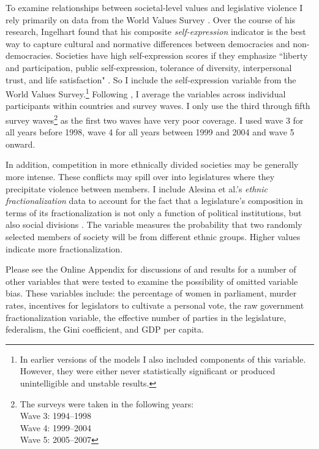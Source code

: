 \documentclass[a4paper]{article}\usepackage[]{graphicx}\usepackage[]{color}
\begin{document}
To examine relationships between societal-level values and legislative violence I rely primarily on data from the World Values Survey \citeyearpar{WVS2009}. Over the course of his research, Ingelhart found that his composite {\emph{self-expression}} indicator is the best way to capture cultural and normative differences between democracies and non-democracies. Societies have high self-expression scores if they emphasize ``liberty and participation, public self-expression, tolerance of diversity, interpersonal trust, and life satisfaction" \citep[64]{Inglehart2003}. So I include the self-expression variable from the World Values Survey.\footnote{In earlier versions of the models I also included components of this variable. However, they were either never statistically significant or produced unintelligible and unstable results.} Following \cite{Inglehart2003}, I average the variables across individual participants within countries and survey waves. I only use the third through fifth survey waves\footnote{The surveys were taken in the following years: \\ Wave 3: 1994--1998 \\ Wave 4: 1999--2004 \\ Wave 5: 2005--2007} as the first two waves have very poor coverage. I used wave 3 for all years before 1998, wave 4 for all years between 1999 and 2004 and wave 5 onward.

In addition, competition in more ethnically divided societies may be generally more intense. These conflicts may spill over into legislatures where they precipitate violence between members. I include Alesina et al.'s \citeyearpar{Alesina2003} {\emph{ethnic fractionalization}} data to account for the fact that a legislature's composition in terms of its fractionalization is not only a function of political institutions, but also social divisions \citep{Neto1997, Mozaffar2003}. The variable measures the probability that two randomly selected members of society will be from different ethnic groups. Higher values indicate more fractionalization.

Please see the Online Appendix for discussions of and results for a number of other variables that were tested to examine the possibility of omitted variable bias. These variables include: the percentage of women in parliament, murder rates, incentives for legislators to cultivate a personal vote, the raw government fractionalization variable, the effective number of parties in the legislature, federalism, the Gini coefficient, and GDP per capita.
\end{document}
